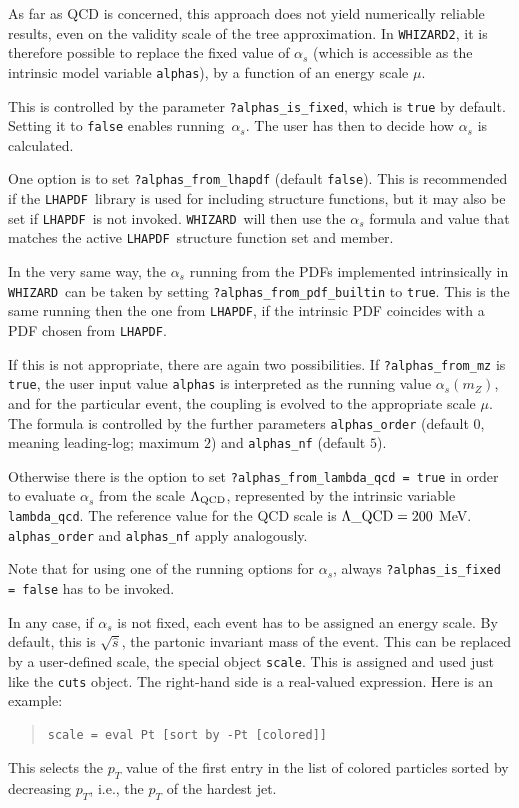 \documentclass[12pt]{book}
\newcommand{\ttt}[1]{\texttt{#1}}
\newcommand{\whizard}{\ttt{WHIZARD}}
\newcommand{\lhapdf}{\ttt{LHAPDF}}
\begin{document}
As far as QCD is concerned, this approach does not yield numerically
reliable results, even on the validity scale of the tree approximation.
In \whizard\ttt{2}, it is therefore possible to replace the fixed value of
$\alpha_s$ (which is accessible as the intrinsic model variable
\verb|alphas|), by a function of an energy scale $\mu$.

This is controlled by the parameter \verb|?alphas_is_fixed|, which is
\ttt{true} by default.  Setting it to \ttt{false} enables running~$\alpha_s$.
The user has then to decide how $\alpha_s$ is calculated.

One option is to set \verb|?alphas_from_lhapdf| (default \ttt{false}).  This
is recommended if the \lhapdf\ library is used for including structure
functions, but it may also be set if \lhapdf\ is not invoked.  \whizard\ will
then use the $\alpha_s$ formula and value that matches the active
\lhapdf\ structure function set and member.

In the very same way, the $\alpha_s$ running from the PDFs implemented
intrinsically in \whizard\ can be taken by setting
\verb|?alphas_from_pdf_builtin| to \ttt{true}. This is the same
running then the one from \lhapdf, if the intrinsic PDF coincides with
a PDF chosen from \lhapdf.

If this is not appropriate, there are again two possibilities.  If
\verb|?alphas_from_mz| is \ttt{true}, the user input value \verb|alphas| is
interpreted as the running value $\alpha_s(m_Z)$, and for the particular
event, the coupling is evolved to the appropriate scale $\mu$.  The formula is
controlled by the further parameters \verb|alphas_order| (default $0$,
meaning leading-log; maximum $2$) and \verb|alphas_nf| (default $5$).

Otherwise there is the option to set \verb|?alphas_from_lambda_qcd = true|
in order to evaluate $\alpha_s$ from the scale $\Lambda_{\rm QCD}$,
represented by the intrinsic variable \verb|lambda_qcd|. The reference
value for the QCD scale is $\Lambda\_{\rm QCD} = 200$
MeV. \verb|alphas_order| and \verb|alphas_nf| apply analogously.

Note that for using one of the running options for $\alpha_s$, always
\ttt{?alphas\_is\_fixed = false} has to be invoked.

In any case, if $\alpha_s$ is not fixed, each event has to be assigned an
energy scale.  By default, this is $\sqrt{\hat s}$, the partonic invariant
mass of the event.  This can be replaced by a user-defined scale, the special
object \ttt{scale}.  This is assigned and used just like the \ttt{cuts}
object.  The right-hand side is a real-valued expression.  Here is an example:
\begin{quote}
\begin{footnotesize}
\begin{verbatim}
scale = eval Pt [sort by -Pt [colored]]
\end{verbatim}
\end{footnotesize}
\end{quote}
This selects the $p_T$ value of the first entry in the list of colored
particles sorted by decreasing $p_T$, i.e., the $p_T$ of the hardest jet.
\end{document}
